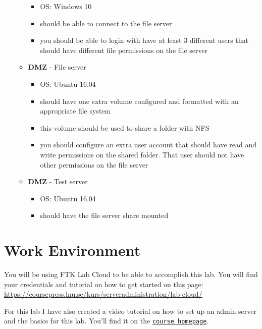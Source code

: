 \documentclass[paper=a4, fontsize=11pt]{report} %
\begin{document}
\begin{itemize}
\begin{itemize}
        \begin{itemize}
			\item OS: Windows 10
			\item should be able to connect to the file server
			\item you should be able to login with have at least 3 different users that should have different file permissions on the file server
        \end{itemize}
        \item \textbf{DMZ} - File server
        \begin{itemize}
			\item OS: Ubuntu 16.04
			\item should have one extra volume configured and formatted with an appropriate file system
			\item this volume should be used to share a folder with NFS
			\item you should configure an extra user account that should have read and write permissions on the shared folder. That user should not have other permissions on the file server
        \end{itemize}
        \item \textbf{DMZ} - Test server
        \begin{itemize}
			\item OS: Ubuntu 16.04
			\item should have the file server share mounted
        \end{itemize}  
    \end{itemize}
\end{itemize}



\section{Work Environment}
\label{environment}

You will be using FTK Lab Cloud to be able to accomplish this lab. You will find your credentials and tutorial on how to get started on this page: \href{https://coursepress.lnu.se/kurs/serveradministration/lab-cloud/}{https://coursepress.lnu.se/kurs/serveradministration/lab-cloud/}

For this lab I have also created a video tutorial on how to set up an admin server and the basics for this lab. You'll find it on the \texttt{\href{https://coursepress.lnu.se/kurs/serveradministration/moduler/modul-2/laboration/}{course homepage}}.
\end{document}
